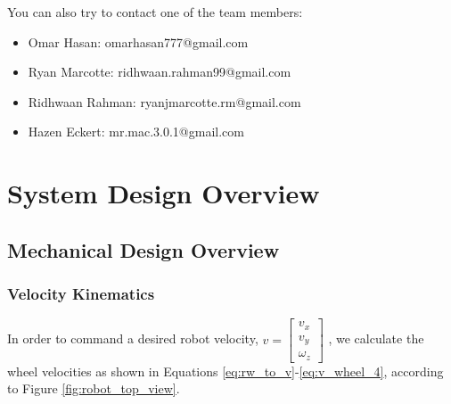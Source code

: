 \documentclass[letterpaper,12pt]{article}
\begin{document}
You can also try to contact one of the team members:
\begin{itemize}
    \item Omar Hasan:           omarhasan777@gmail.com
    \item Ryan Marcotte:        ridhwaan.rahman99@gmail.com
    \item Ridhwaan Rahman:      ryanjmarcotte.rm@gmail.com
    \item Hazen Eckert:         mr.mac.3.0.1@gmail.com
\end{itemize}

\pagebreak
\tableofcontents
\pagebreak

\section{System Design Overview}

\subsection{Mechanical Design Overview}
\subsubsection{Velocity Kinematics}
\label{sec:ar9331_vel_kin}

In order to command a desired robot velocity,
\begin{math}
  v=
  \begin{bmatrix}
    v_x \\
    v_y \\
    \omega_z
  \end{bmatrix}
\end{math}
, we calculate the wheel velocities as shown in Equations \ref{eq:rw_to_v}-\ref{eq:v_wheel_4}, according to Figure \ref{fig:robot_top_view}.
\end{document}
